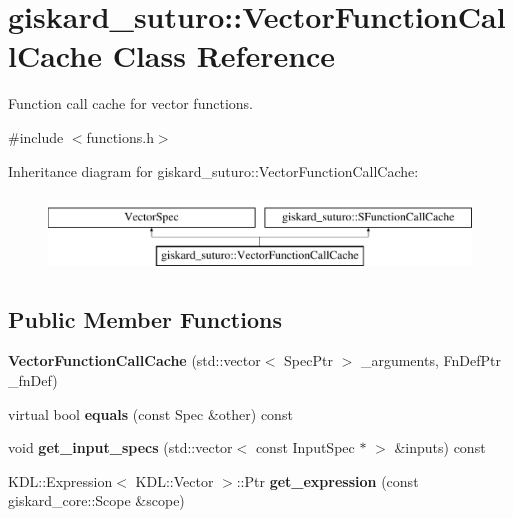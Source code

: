 \hypertarget{classgiskard__suturo_1_1VectorFunctionCallCache}{\section{giskard\-\_\-suturo\-:\-:Vector\-Function\-Call\-Cache Class Reference}
\label{classgiskard__suturo_1_1VectorFunctionCallCache}
}


Function call cache for vector functions.  




{\ttfamily \#include $<$functions.\-h$>$}

Inheritance diagram for giskard\-\_\-suturo\-:\-:Vector\-Function\-Call\-Cache\-:\begin{figure}[H]
\begin{center}
\leavevmode
\includegraphics[height=2.000000cm]{classgiskard__suturo_1_1VectorFunctionCallCache}
\end{center}
\end{figure}
\subsection*{Public Member Functions}
\begin{DoxyCompactItemize}
\item 
\hypertarget{classgiskard__suturo_1_1VectorFunctionCallCache_a53d433daeb65d992e5e86029ccf7a1ee}{{\bfseries Vector\-Function\-Call\-Cache} (std\-::vector$<$ Spec\-Ptr $>$ \-\_\-arguments, Fn\-Def\-Ptr \-\_\-fn\-Def)}\label{classgiskard__suturo_1_1VectorFunctionCallCache_a53d433daeb65d992e5e86029ccf7a1ee}

\item 
\hypertarget{classgiskard__suturo_1_1VectorFunctionCallCache_a633ebfe8ddb9b0fffa9c8fa05ca1938e}{virtual bool {\bfseries equals} (const Spec \&other) const }\label{classgiskard__suturo_1_1VectorFunctionCallCache_a633ebfe8ddb9b0fffa9c8fa05ca1938e}

\item 
\hypertarget{classgiskard__suturo_1_1VectorFunctionCallCache_a5dfd205ece902e4a56fb5b30639b2b2b}{void {\bfseries get\-\_\-input\-\_\-specs} (std\-::vector$<$ const Input\-Spec $\ast$ $>$ \&inputs) const }\label{classgiskard__suturo_1_1VectorFunctionCallCache_a5dfd205ece902e4a56fb5b30639b2b2b}

\item 
\hypertarget{classgiskard__suturo_1_1VectorFunctionCallCache_a77a720a3ada6e2c43ce35c962def3302}{K\-D\-L\-::\-Expression$<$ K\-D\-L\-::\-Vector $>$\-::Ptr {\bfseries get\-\_\-expression} (const giskard\-\_\-core\-::\-Scope \&scope)}\label{classgiskard__suturo_1_1VectorFunctionCallCache_a77a720a3ada6e2c43ce35c962def3302}

\end{DoxyCompactItemize}
